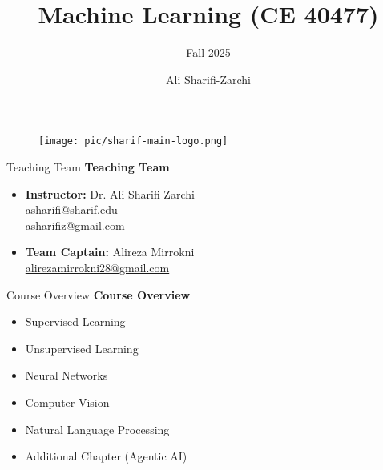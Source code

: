 \documentclass[serif, aspectratio=169]{beamer}
\author{Ali Sharifi-Zarchi}
\title{Machine Learning (CE 40477)}
\subtitle{Fall 2025}
\institute{
    CE Department \\
    Sharif University of Technology
}
\begin{document}
    \begin{frame}
        \titlepage
        \vspace*{-0.6cm}
        \begin{figure}[htpb]
            \begin{center}
                \texttt{[image: pic/sharif-main-logo.png]}
            \end{center}
        \end{figure}

    \end{frame}


    \begin{frame}{Teaching Team}
        \textbf{Teaching Team}
        \begin{itemize}
            \item \textbf{Instructor:} Dr. Ali Sharifi Zarchi \\
            \href{mailto:asharifi@sharif.edu}{asharifi@sharif.edu} \\
            \href{mailto:asharifiz@gmail.com}{asharifiz@gmail.com}
            \item \textbf{Team Captain:} Alireza Mirrokni \\
            \href{mailto:alirezamirrokni28@gmail.com}{alirezamirrokni28@gmail.com}
        \end{itemize}


    \end{frame}


    \begin{frame}{Course Overview}
        \textbf{Course Overview}
        \begin{itemize}
            \item Supervised Learning
            \item Unsupervised Learning
            \item Neural Networks
            \item Computer Vision
            \item Natural Language Processing
            \item Additional Chapter (Agentic AI)
        \end{itemize}
    \end{frame}
\end{document}
